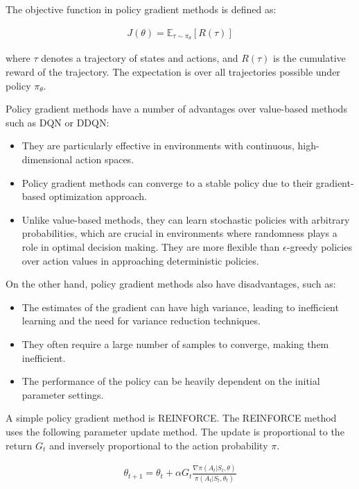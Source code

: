 The objective function in policy gradient methods is defined as:

\begin{align*}
J(\theta) = \mathbb{E}_{\tau \sim \pi_\theta} \left[ R(\tau) \right]
\end{align*}

where $\tau$ denotes a trajectory of states and actions, and $R(\tau)$ is the cumulative reward of the trajectory. The expectation is over all trajectories possible under policy $\pi_\theta$.

Policy gradient methods have a number of advantages over value-based methods such as DQN or DDQN:
\begin{itemize}
\item They are particularly effective in environments with continuous, high-dimensional action spaces.
\item Policy gradient methods can converge to a stable policy due to their gradient-based optimization approach.
\item Unlike value-based methods, they can learn stochastic policies with arbitrary probabilities, which are crucial in environments where randomness plays a role in optimal decision making. They are more flexible than $\epsilon$-greedy policies over action values in approaching deterministic policies.
\end{itemize}

On the other hand, policy gradient methods also have disadvantages, such as:
\begin{itemize}
\item The estimates of the gradient can have high variance, leading to inefficient learning and the need for variance reduction techniques.
\item They often require a large number of samples to converge, making them inefficient.
\item The performance of the policy can be heavily dependent on the initial parameter settings.
\end{itemize}

A simple policy gradient method is REINFORCE. The REINFORCE method uses the following parameter update method. The update is proportional to the return $G_t$ and inversely proportional to the action probability $\pi$. 

\begin{align}
\theta_{t+1} = \theta_t + \alpha G_t \frac{\nabla \pi(A_t | S_t, \theta)}{\pi(A_t | S_t, \theta_t)} \label{eq:reinforce}
\end{align}

